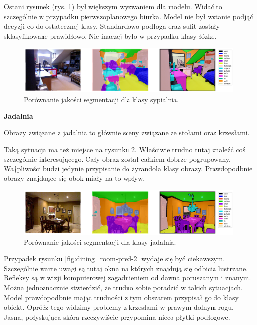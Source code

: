 Ostani rysunek (rys. \ref{fig:bedroom-pred-3}) był większym wyzwaniem dla modelu. Widać to szczególnie w przypadku pierwszoplanowego biurka. Model nie był wstanie podjąć decyzji co do ostatecznej klasy. Standardowo podłoga oraz sufit zostały sklasyfikowane prawidłowo. Nie inaczej było w przypadku klasy łózko.
\begin{figure}[ht!]
    \centering
    \includegraphics[width=\textwidth]{img/preds_analysis/gt_vs_pred/bedroom-3.png}
    \caption{Porównanie jakości segmentacji dla klasy sypialnia.}
    \label{fig:bedroom-pred-3}
\end{figure}

\noindent
\textbf{Jadalnia}

Obrazy związane z jadalnia to głównie sceny związane ze stołami oraz krzesłami.

Taką sytuacja ma też miejsce na rysunku \ref{fig:dining_room-pred-1}. Właściwie trudno tutaj znaleźć coś szczególnie interesującego. Cały obraz został całkiem dobrze pogrupowany. Wa†pliwości budzi jedynie przypisanie do żyrandola klasy obrazy. Prawdopodbnie obrazy znajduące się obok miały na to wpływ.


\begin{figure}[ht!]
    \centering
    \includegraphics[width=\textwidth]{img/preds_analysis/gt_vs_pred/dining_room-1.png}
    \caption{Porównanie jakości segmentacji dla klasy jadalnia.}
    \label{fig:dining_room-pred-1}
\end{figure}

Przypadek rysunku \ref{fig:dining_room-pred-2} wydaje się być ciekawszym. Szczególnie warte uwagi są tutaj okna na których znajdują się odbicia lustrzane. Refleksy są w wizji komputerowej zagadnieniem od dawna poruszanym i znanym. Można jednoznacznie stwierdzić, że trudno sobie poradzić w takich sytuacjach. Model prawdopodbnie mając trudności z tym obszarem przypisał go do klasy obiekt. Opróćz tego widzimy problemy z krzesłami w prawym dolnym rogu. Jasna, połyskująca skóra rzeczywiście przypomina nieco płytki podłogowe.


